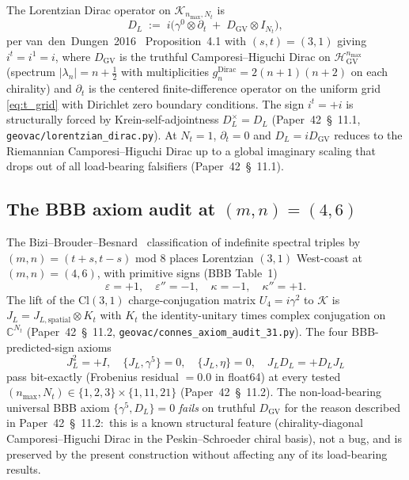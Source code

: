 \documentclass[11pt,a4paper]{article}
\theoremstyle{plain}
\theoremstyle{definition}
\newcommand{\nmax}{n_{\max}}
\newcommand{\Nt}{N_t}
\newcommand{\Krein}{\mathcal{K}}
\newcommand{\C}{\mathbb{C}}
\newcommand{\DGV}{D_{\mathrm{GV}}}
\newcommand{\DL}{D_L}
\newcommand{\JL}{J_L}
\newcommand{\HGV}{\mathcal{H}_{\mathrm{GV}}}
\begin{document}
The Lorentzian Dirac operator on $\Krein_{\nmax, \Nt}$ is
\begin{equation}\label{eq:DL_def}
   \DL \;:=\; i\bigl(
              \gamma^0 \otimes \partial_t
              \;+\; \DGV \otimes I_{\Nt}
            \bigr),
\end{equation}
per van~den~Dungen~2016~\cite{vandungen2016} Proposition~4.1 with
$(s, t) = (3, 1)$ giving $i^t = i^1 = i$, where $\DGV$ is the
truthful Camporesi--Higuchi Dirac on $\HGV^{\nmax}$
(spectrum $|\lambda_n| = n + \tfrac{1}{2}$ with multiplicities
$g_n^{\mathrm{Dirac}} = 2(n+1)(n+2)$ on each chirality) and
$\partial_t$ is the centered finite-difference operator on the
uniform grid \eqref{eq:t_grid} with Dirichlet zero boundary
conditions. The sign $i^t = +i$ is structurally forced by
Krein-self-adjointness $\DL^\times = \DL$ (Paper~42~\S~11.1,
\texttt{geovac/lorentzian\_dirac.py}). At $\Nt = 1$, $\partial_t = 0$
and $\DL = i\DGV$ reduces to the Riemannian Camporesi--Higuchi
Dirac up to a global imaginary scaling that drops out of all
load-bearing falsifiers (Paper~42~\S~11.1).

\subsection{The BBB axiom audit at $(m, n) = (4, 6)$}\label{sec:bbb}

The Bizi--Brouder--Besnard~\cite{bizi_brouder_besnard2018}
classification of indefinite spectral triples by
$(m, n) = (t + s, t - s)$ mod $8$ places Lorentzian $(3, 1)$ West-coast
at $(m, n) = (4, 6)$, with primitive signs (BBB Table~1)
\begin{equation}\label{eq:bbb_signs}
   \varepsilon = +1, \quad
   \varepsilon'' = -1, \quad
   \kappa = -1, \quad
   \kappa'' = +1.
\end{equation}
The lift of the Cl$(3,1)$ charge-conjugation matrix $U_4 = i\gamma^2$
to $\Krein$ is $\JL = J_{L, \mathrm{spatial}} \otimes K_t$ with $K_t$
the identity-unitary times complex conjugation on $\C^{\Nt}$
(Paper~42~\S~11.2, \texttt{geovac/connes\_axiom\_audit\_31.py}). The
four BBB-predicted-sign axioms
\begin{equation}\label{eq:bbb_axioms}
   \JL^2 = +I, \quad
   \{\JL, \gamma^5\} = 0, \quad
   \{\JL, \eta\} = 0, \quad
   \JL \DL = +\DL \JL
\end{equation}
pass bit-exactly (Frobenius residual $= 0.0$ in float64) at every
tested $(\nmax, \Nt) \in \{1, 2, 3\} \times \{1, 11, 21\}$
(Paper~42~\S~11.2). The non-load-bearing universal BBB axiom
$\{\gamma^5, \DL\} = 0$ \emph{fails} on truthful $\DGV$ for the
reason described in Paper~42~\S~11.2:\ this is a known structural
feature (chirality-diagonal Camporesi--Higuchi Dirac in the
Peskin--Schroeder chiral basis), not a bug, and is preserved by the
present construction without affecting any of its load-bearing
results.
\end{document}

